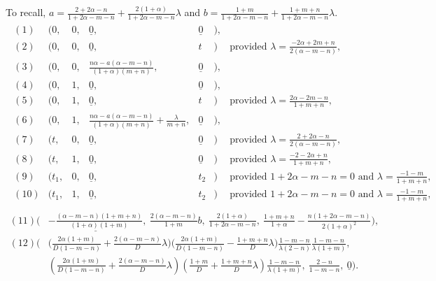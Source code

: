 \documentclass[a4paper,11pt]{article}
\theoremstyle{remark}
\begin{document}
To recall, $a=\frac{2+2\alpha-n}{1+2\alpha-m-n} + \frac{2(1 + \alpha)}{1+2\alpha-m-n}\lambda$ and $b=\frac{1+m}{1+2\alpha-m-n} + \frac{1+m+n}{1+2\alpha-m-n}\lambda$. 
\allowdisplaybreaks
\begin{align*}
 \begin{array}{lllllll}
  (1) &\Big(0,&0,& \underline{0},&\underline{0}&\Big), \\%
  (2) &\Big(0,&0,& \underline{0},&t&            \Big) &\text{provided } \lambda = \frac{-2\alpha+2m+n}{2(\alpha-m-n)},\\
  (3) &\Big(0,&0,& \frac{n\alpha - a(\alpha-m-n)}{(1+\alpha)(m+n)}, &\underline{0}&\Big),\\
  (4) &\Big(0,&1,& \underline{0},&\underline{0}&\Big), \\
  (5) &\Big(0,&1,& \underline{0},&t&           \Big) &\text{provided } \lambda = \frac{2\alpha-2m-n}{1+m+n},\\
  (6) &\Big(0,&1,& \frac{n\alpha - a(\alpha-m-n)}{(1+\alpha)(m+n)}+\frac{\lambda}{m+n}, &\underline{0}&\Big),\\
  (7) &\Big(t,&0,& \underline{0},&\underline{0}&\Big) &\text{provided } \lambda=\frac{2+2\alpha-n}{2(\alpha-m-n)}, \\
  (8) &\Big(t,&1,& \underline{0},&\underline{0}&\Big) &\text{provided } \lambda=\frac{-2-2\alpha+n}{1+m+n}, \\
  (9) &\Big(t_1,&0,& \underline{0},&t_2&           \Big) &\text{provided $1+2\alpha-m-n=0$ and $\lambda=\frac{-1-m}{1+m+n}$}, \\
 (10) &\Big(t_1,&1,& \underline{0},&t_2&           \Big) &\text{provided $1+2\alpha-m-n=0$ and $\lambda=\frac{-1-m}{1+m+n}$}, \\
 \end{array}
\end{align*}
\begin{align*}
(11) \Big(&\underline{ -\frac{(\alpha-m-n)(1+m+n)}{(1+\alpha)(1+m)}}, \:\frac{2(\alpha-m-n)}{1+m}b, \:\frac{2(1+\alpha)}{1+2\alpha-m-n}, \:\frac{1+m+n}{1+\alpha} - \frac{n(1+2\alpha-m-n)}{2(1+\alpha)^2}\Big),\\
(12) \bigg(&\Big ( \frac{2\alpha(1+m)}{D(1-m-n)} + \frac{2(\alpha-m-n)}{D}\lambda\Big)\Big(\frac{2\alpha(1+m)}{D(1-m-n)} - \frac{1+m+n}{D}\lambda\Big)\frac{1-m-n}{\lambda(2-n)}\frac{1-m-n}{\lambda(1+m)}, \\
 &\left( \frac{2\alpha(1+m)}{D(1-m-n)} + \frac{2(\alpha-m-n)}{D}\lambda\right)\left(\frac{1+m}{D} + \frac{1+m+n}{D}\lambda\right)\frac{1-m-n}{\lambda(1+m)}, \ \frac{2-n}{1-m-n}, \ \underline{0}\bigg).
\end{align*}
\end{document}
